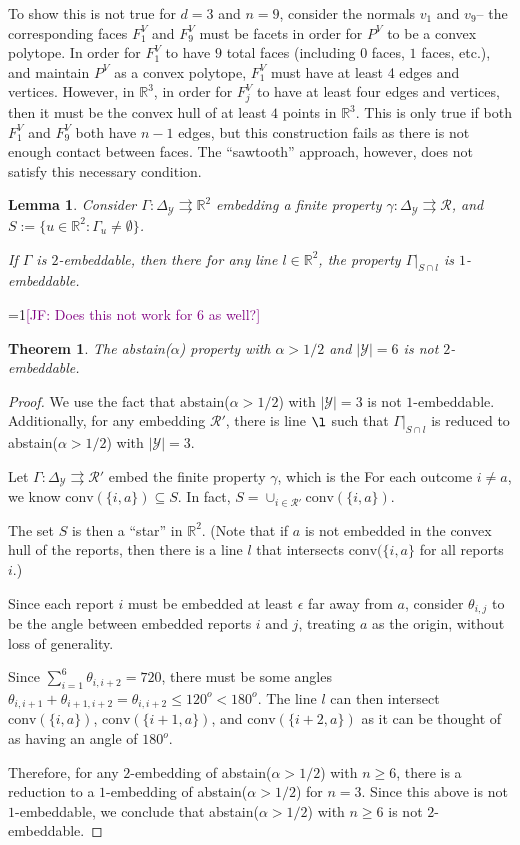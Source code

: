 \documentclass[12pt]{article}
\newcommand{\Comments}{1}
\newcommand{\mynote}[2]{\ifnum\Comments=1\textcolor{#1}{#2}\fi}
\newcommand{\jessie}[1]{\mynote{purple}{[JF: #1]}}
\newcommand{\reals}{\mathbb{R}}
\newcommand{\R}{\mathcal{R}}
\newcommand{\Y}{\mathcal{Y}}
\newcommand{\simplex}{\Delta_{\Y}}
\newcommand{\toto}{\rightrightarrows}
\newcommand{\conv}{\mathrm{conv}}
\newtheorem{theorem}{Theorem}
\newtheorem{lemma}{Lemma}
\begin{document}
To show this is not true for $d=3$ and $n=9$, consider the normals $v_1$ and $v_9$-- the corresponding faces $F^V_1$ and $F_9^V$ must be facets in order for $P^V$ to be a convex polytope.
In order for $F_1^V$ to have $9$ total faces (including $0$ faces, $1$ faces, etc.), and maintain $P^V$ as a convex polytope, $F_1^V$ must have at least 4 edges and vertices.
However, in $\reals^3$, in order for $F_j^V$ to have at least four edges and vertices, then it must be the convex hull of at least $4$ points in $\reals^3$.
This is only true if both $F^V_1$ and $F_9^V$ both have $n-1$ edges, but this construction fails as there is not enough contact between faces.
The ``sawtooth'' approach, however, does not satisfy this necessary condition.

\newpage
\begin{lemma}
	Consider $\Gamma:\simplex \toto \reals^2$ embedding a finite property $\gamma: \simplex \toto \R$, and $S := \{u \in \reals^2 : \Gamma_u \neq \emptyset\}$.
	
	If $\Gamma$ is $2$-embeddable, then there for any line $l \in \reals^2$, the property $\Gamma|_{S\cap l}$ is $1$-embeddable.
\end{lemma}


\jessie{Does this not work for 6 as well?}
\begin{theorem}
	The abstain($\alpha$) property with $\alpha > 1/2$ and $|\Y| = 6$ is not $2$-embeddable.
\end{theorem}
\begin{proof}
  We use the fact that abstain($\alpha > 1/2$)  with $|\Y| = 3$ is not $1$-embeddable.
  Additionally, for any embedding $\R'$, there is line $\l$ such that $\Gamma|_{S \cap l}$ is reduced to abstain($\alpha > 1/2$)  with $|\Y| = 3$.
	
  Let $\Gamma:\simplex \toto \R'$ embed the finite property $\gamma$, which is the 
  For each outcome $i \neq a$, we know $\conv(\{i,a\}) \subseteq S$.
	In fact, $S = \cup_{i \in \R'} \conv(\{i,a\})$.
	
  The set $S$ is then a ``star'' in $\reals^2$.
  (Note that if $a$ is not embedded in the convex hull of the reports, then there is a line $l$ that intersects $\conv(\{i,a\}$ for all reports $i$.)
	
  Since each report $i$ must be embedded at least $\epsilon$ far away from $a$, consider $\theta_{i,j}$ to be the angle between embedded reports $i$ and $j$, treating $a$ as the origin, without loss of generality.
	
  Since $\sum_{i=1}^6 \theta_{i,i+2} =720$, there must be some angles $\theta_{i,i+1} + \theta_{i+1,i+2} = \theta_{i,i+2} \leq 120^o < 180^o$.
  The line $l$ can then intersect $\conv(\{i,a\})$, $\conv(\{i+1, a\})$, and $\conv(\{i+2, a\})$ as it can be thought of as having an angle of $180^o$.


  Therefore, for any $2$-embedding of abstain($\alpha > 1/2$) with $n \geq 6$, there is a reduction to a $1$-embedding of abstain($\alpha > 1/2$) for $n = 3$.
  Since this above is not $1$-embeddable, we conclude that abstain($\alpha > 1/2$) with $n \geq 6$ is not $2$-embeddable.
\end{proof}
\end{document}
